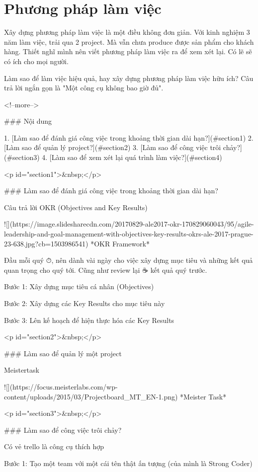 \chapter{Phương pháp làm việc}

Xây dựng phương pháp làm việc là một điều không đơn giản. Với kinh nghiệm 3 năm làm việc, trải qua 2 project. Mà vẫn chưa produce được sản phẩm cho khách hàng. Thiết nghĩ mình nên viết phương pháp làm việc ra để xem xét lại. Có lẽ sẽ có ích cho mọi người.

Làm sao để làm việc hiệu quả, hay xây dựng phương pháp làm việc hữu ích? Câu trả lời ngắn gọn là "Một công cụ không bao giờ đủ".

<!--more-->

### Nội dung

1. [Làm sao để đánh giá công việc trong khoảng thời gian dài hạn?](#section1)
2. [Làm sao để quản lý project?](#section2)
3. [Làm sao để công việc trôi chảy?](#section3)
4. [Làm sao để xem xét lại quá trình làm việc?](#section4)

<p id="section1">&nbsp;</p>

### Làm sao để đánh giá công việc trong khoảng thời gian dài hạn?

Câu trả lời OKR (Objectives and Key Results)

![](https://image.slidesharecdn.com/20170829-ale2017-okr-170829060043/95/agile-leadership-and-goal-management-with-objectives-key-results-okrs-ale-2017-prague-23-638.jpg?cb=1503986541)
*OKR Framework*

Đầu mỗi quý ⏱, nên dành vài ngày cho việc xây dựng mục tiêu và những kết quả quan trọng cho quý tới. Cũng như review lại ☕ kết quả quý trước.

Bước 1: Xây dựng mục tiêu cá nhân (Objectives)

Bước 2: Xây dựng các Key Results cho mục tiêu này

Bước 3: Lên kế hoạch để hiện thực hóa các Key Results

<p id="section2">&nbsp;</p>

### Làm sao để quản lý một project

Meistertask

![](https://focus.meisterlabs.com/wp-content/uploads/2015/03/Projectboard_MT_EN-1.png)
*Meister Task*

<p id="section3">&nbsp;</p>

### Làm sao để công việc trôi chảy?

Có vẻ trello là công cụ thích hợp

Bước 1: Tạo một team với một cái tên thật ấn tượng (của mình là Strong Coder)

